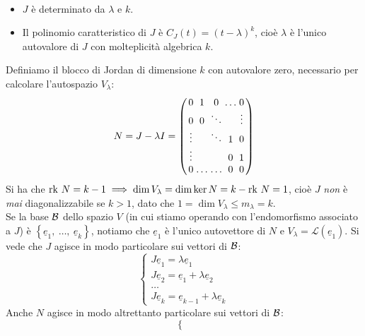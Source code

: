 \begin{observe}~{}
	\begin{itemize}
		\item $J$ è determinato da $\lambda$ e $k$.
		\item Il polinomio caratteristico di $J$ è $C_J\left(t\right)=\left(t-\lambda\right)^k$, cioè $\lambda$ è l'unico autovalore di $J$ con molteplicità algebrica $k$.
	\end{itemize}	
\end{observe}
\begin{observe}
Definiamo il blocco di Jordan di dimensione $k$ con autovalore zero, necessario per calcolare l'autospazio $V_\lambda$:
		\begin{equation}\setlength\arraycolsep{0.5mm}
			N=J-\lambda I= \left(
				\begin{array}{ccccc}
				0	& 1 		&  0		& \ldots 	& 0 \\
				0		& 0 	& \ddots	& 			& \vdots\\
				\vdots	&  			& \ddots	& 1 		& 0\\
				\vdots	& 			&   		& 0 	& 1\\
				0		&  \dots  	&  \dots 	&  0 		& 0
			\end{array}
			\right)
		\end{equation}
Si ha che $\mathrm{rk}\  N=k-1\implies \dim V_{\lambda}=\dim \ker N=k-\mathrm{rk}\  N= 1$, cioè $J$ \textit{non} è \textit{mai} diagonalizzabile se $k>1$, dato che $1=\dim V_{\lambda}\leq m_\lambda = k$.\\
Se la base $\mathcal{B}$ dello spazio $V$ (in cui stiamo operando con l'endomorfismo associato a $J$) è $\left\{\underline{e}_1,\ \ldots,\ \underline{e}_k\right\}$, notiamo che $\underline{e}_1$ è l'unico autovettore di $N$ e $V_\lambda=\mathcal{L}\left(\underline{e}_1\right)$. Si vede che $J$ agisce in modo particolare sui vettori di $\mathcal{B}$:
\begin{equation*}
\begin{cases}
J\underline{e}_1=\lambda \underline{e}_1\\
J\underline{e}_2=\underline{e}_1+\lambda \underline{e}_2\\
\ldots\\
J\underline{e}_k=\underline{e}_{k-1}+\lambda \underline{e}_k
\end{cases}
\end{equation*}
Anche $N$ agisce in modo altrettanto particolare sui vettori di $\mathcal{B}$:
\begin{equation*}
	\begin{cases}

\end{cases}
\end{equation*}
\end{observe}
